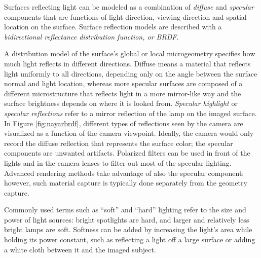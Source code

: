 Surfaces reflecting light can be modeled as a combination of \emph{diffuse} and \emph{specular} components that are functions of light direction, viewing direction and spatial location on the surface.
Surface reflection models are described with a \emph{bidirectional reflectance distribution function, or BRDF}. \cite{nicodemus1965directional}

A distribution model of the surface's global or local microgeometry specifies how much light reflects in different directions. \cite{nayar1991surface} %
Diffuse means a material that reflects light uniformly to all directions, depending only on the angle between the surface normal and light location, whereas more specular surfaces are composed of a different microstructure that reflects light in a more mirror-like way and the surface brightness depends on where it is looked from.
\emph{Specular highlight} or \emph{specular reflections} refer to a mirror reflection of the lamp on the imaged surface.
In Figure \ref{fig:nayarbrdf}, different types of reflections seen by the camera are visualized as a function of the camera viewpoint.
Ideally, the camera would only record the diffuse reflection that represents the surface color;
the specular components are unwanted artifacts.
Polarized filters can be used in front of the lights and in the camera lenses to filter out most of the specular lighting.
Advanced rendering methods take advantage of also the specular component; however, such material capture is typically done separately from the geometry capture.


Commonly used terms such as ``soft'' and ``hard'' lighting refer to the size and power of light sources: bright spotlights are hard, and larger and relatively less bright lamps are soft.
Softness can be added by increasing the light's area while holding its power constant, such as reflecting a light off a large surface or adding a white cloth between it and the imaged subject.
\cite[p. 108]{langford2000basic}

